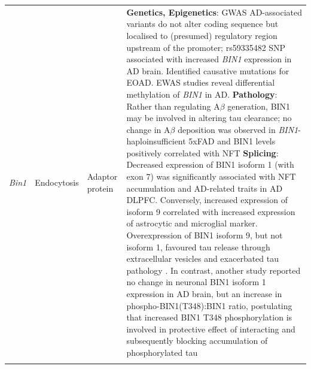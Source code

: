 \begin{changemargin}{1.5cm}
\begin{landscape}
\begin{longtable}[c]{p{1cm}p{2cm}p{4cm}p{19cm}}
			\centering \textit{Bin1} &
			\centering Endocytosis  &
			\centering Adaptor protein &
			\tabitem \textbf{Genetics, Epigenetics}: GWAS AD-associated variants do not alter coding sequence but localised to (presumed) regulatory region upstream of the promoter; rs59335482 SNP associated with increased \textit{BIN1} expression in AD brain\cite{Chapuis2013}. Identified causative mutations for EOAD.  EWAS studies reveal differential methylation of \textit{BIN1} in AD.  \newline
			\tabitem \textbf{Pathology}: Rather than regulating A$\beta$ generation, BIN1 may be involved in altering tau clearance; no change in A$\beta$ deposition was observed in \textit{BIN1}-haploinsufficient 5xFAD \cite{Andrew2019} and BIN1 levels positively correlated with NFT\cite{Crotti2019}\newline 
			\tabitem \textbf{Splicing}: Decreased expression of BIN1 isoform 1 (with exon 7) was significantly associated with NFT accumulation and AD-related traits in AD DLPFC\cite{Taga2020}. Conversely, increased expression of isoform 9 correlated with increased expression of astrocytic and microglial marker\cite{Taga2020}. Overexpression of BIN1 isoform 9, but not isoform 1, favoured tau release through extracellular vesicles and exacerbated tau pathology \cite{Crotti2019}. \newline
			\tabitem In contrast, another study reported no change in neuronal BIN1 isoform 1 expression in AD brain, but an increase in phospho-BIN1(T348):BIN1 ratio, postulating that increased BIN1 T348 phosphorylation is involved in protective effect of interacting and subsequently blocking accumulation of phosphorylated tau\cite{Sartori2019} \\
			\hdashline[0.5pt/5pt]
			

\end{longtable}
\end{landscape}
\end{changemargin}
